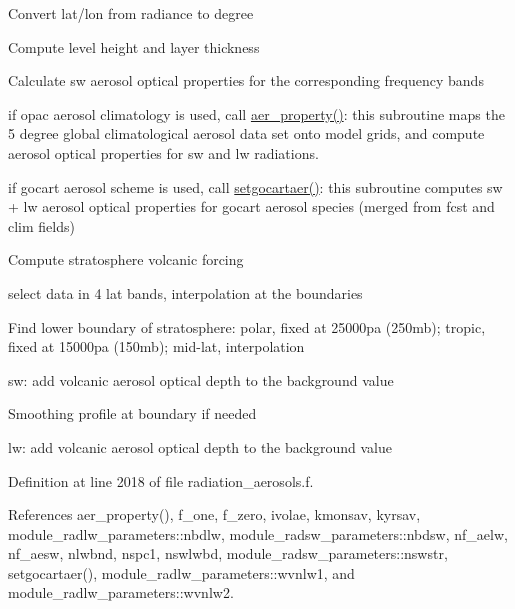 \begin{DoxyEnumerate}
\item Convert lat/lon from radiance to degree
\item Compute level height and layer thickness
\item Calculate sw aerosol optical properties for the corresponding frequency bands
\begin{DoxyItemize}
\item if opac aerosol climatology is used, call \hyperlink{group__module__radiation__aerosols_ga021aee92f6c64f78fc11e26d5b2288cf}{aer\+\_\+property()}\+: this subroutine maps the 5 degree global climatological aerosol data set onto model grids, and compute aerosol optical properties for sw and lw radiations.
\item if gocart aerosol scheme is used, call \hyperlink{group__module__radiation__aerosols_ga685dc5ac4b7da2a375800bef712cbb8b}{setgocartaer()}\+: this subroutine computes sw + lw aerosol optical properties for gocart aerosol species (merged from fcst and clim fields)
\end{DoxyItemize}
\item Compute stratosphere volcanic forcing
\begin{DoxyItemize}
\item select data in 4 lat bands, interpolation at the boundaries
\item Find lower boundary of stratosphere\+: polar, fixed at 25000pa (250mb); tropic, fixed at 15000pa (150mb); mid-\/lat, interpolation
\item sw\+: add volcanic aerosol optical depth to the background value
\item Smoothing profile at boundary if needed
\item lw\+: add volcanic aerosol optical depth to the background value 
\end{DoxyItemize}
\end{DoxyEnumerate}

Definition at line 2018 of file radiation\+\_\+aerosols.\+f.



References aer\+\_\+property(), f\+\_\+one, f\+\_\+zero, ivolae, kmonsav, kyrsav, module\+\_\+radlw\+\_\+parameters\+::nbdlw, module\+\_\+radsw\+\_\+parameters\+::nbdsw, nf\+\_\+aelw, nf\+\_\+aesw, nlwbnd, nspc1, nswlwbd, module\+\_\+radsw\+\_\+parameters\+::nswstr, setgocartaer(), module\+\_\+radlw\+\_\+parameters\+::wvnlw1, and module\+\_\+radlw\+\_\+parameters\+::wvnlw2.



